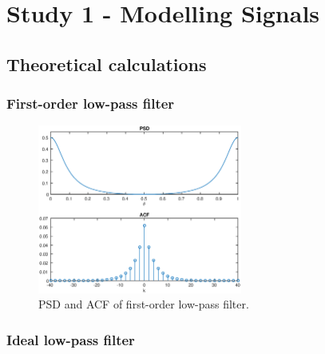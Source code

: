 


\section{Study 1 - Modelling Signals}




\subsection{Theoretical calculations}




\subsubsection{First-order low-pass filter}

\begin{figure}[h]
\centering
\includegraphics[width=0.6\textwidth]{bilder/Lab1/Lab1fig1.eps}
\caption{PSD and ACF of first-order low-pass filter.}
\label{fig:Lab1fig1}
\end{figure}




\subsubsection{Ideal low-pass filter}

